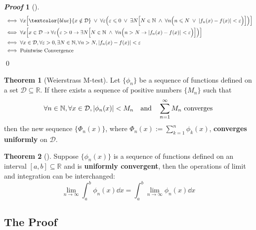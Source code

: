 \documentclass[10pt,UTF8]{article}
\newenvironment{theoremBox}
{
  \begin{tcolorbox}[colback=yellow!5!white,colframe=yellow!75!black,parbox=false,before
  upper=\par,before lower=\par]}
  {
\end{tcolorbox}}
\theoremstyle{definition}
\newtheorem{definition inner}{Definition}[section]
\theoremstyle{definition}
\newtheorem{theorem inner}{Theorem}[section]
\newenvironment{theorem}[1][]
{
  \begin{theoremBox}
  \begin{theorem inner}[#1]\hfill\par}
    {
    \end{theorem inner}
\end{theoremBox}}
\theoremstyle{definition}
\newtheorem*{proof inner}{\textit{Proof}}
\renewenvironment{proof}[1][]
{
\begin{proof inner}[#1]\hfill\par}
  {\qed\vphantom{.}
\end{proof inner}}
\theoremstyle{plain}
\newtheorem{tip inner}{Tip}[section]
\theoremstyle{remark}
\begin{document}
\begin{proof}
\begin{align*}
    &\iff
    \forall x \Big[
      \textcolor{blue}{x \notin \mathcal{D}} \; \lor \;
      \forall \varepsilon \Big(
        \varepsilon \leqslant 0 \; \lor \; \exists N \Big[
          N \in \mathbb{N} \; \land \; \forall n \Big(
            n \leqslant N \; \lor \;
            \abs{f_n(x) - f(x)} < \varepsilon
          \Big)
        \Big]
      \Big)
    \Big] \\
    &\iff
    \forall x \Big[
      x \in \mathcal{D} \to
      \forall \varepsilon \Big(
        \varepsilon > 0 \to \exists N \Big[
          N \in \mathbb{N} \; \land \; \forall n \Big(
            n > N \to
            \abs{f_n(x) - f(x)} < \varepsilon
          \Big)
        \Big]
      \Big)
    \Big] \\
    &\iff
    \forall x \in \mathcal{D}, \forall \varepsilon > 0,
    \exists N \in \mathbb{N}, \forall n > N,
    \abs{f_n(x) - f(x)} < \varepsilon \\
    &\iff \text{Pointwise Convergence}
  \end{align*}
\end{proof}

\begin{theorem}[Weierstrass M-test]\label{thm: Weierstrass M-test}
  Let \( \{\phi_n\} \) be a sequence of functions defined on a set
  \(\mathcal{D} \subseteq \mathbb{R}\).
  If there exists a sequence of positive numbers \( \{M_n\} \) such that
  \begin{equation*}
    \forall n \in \mathbb{N}, \forall x \in \mathcal{D},
    \abs{\phi_n(x)} < M_n
    \qand \sum_{n=1}^{\infty} M_n \text{ converges}
  \end{equation*}
  then the new sequence \( \{\Phi_n(x)\} \),
  where \(\displaystyle \Phi_n(x) := \sum_{k=1}^{n} \phi_k(x)\),
  \textbf{converges uniformly} on \(\mathcal{D}\).
\end{theorem}

\begin{theorem}\label{thm: limit and integration can be interchanged}
  Suppose \( \{\phi_n(x)\} \) is a sequence of functions defined on
  an interval
  \([a,b] \subseteq \mathbb{R}\) and is \textbf{uniformly convergent},
  then the operations of limit and integration can be interchanged:
  \begin{equation*}
    \lim_{n\to\infty} \int_{a}^{b} \phi_n(x) \dd{x} =
    \int_{a}^{b} \lim_{n\to\infty} \phi_n(x) \dd{x}
  \end{equation*}
\end{theorem}

\subsection{The Proof}
\end{document}
